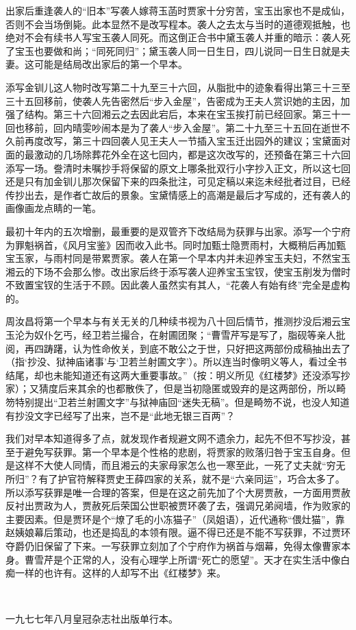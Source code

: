 \par 出家后重逢袭人的“旧本”写袭人嫁蒋玉菡时贾家十分穷苦，宝玉出家也不是成仙，否则不会当场倒毙。此本显然不是改写程本。袭人之去太与当时的道德观抵触，也绝对不会有续书人写宝玉袭人同死。而这倒正合书中黛玉袭人并重的暗示：袭人死了宝玉也要做和尚；“同死同归”；黛玉袭人同一日生日，四儿说同一日生日就是夫妻。这可能是结局改出家后的第一个早本。
\par 添写金钏儿这人物时改写第二十九至三十六回，从脂批中的迹象看得出第三十三至三十五回移前，使袭人先告密然后“步入金屋”，告密成为王夫人赏识她的主因，加强了结构。第三十六回湘云之去因此宕后，本来在宝玉挨打前已经回家。第三十一回也移前，回内晴雯吵闹本是为了袭人“步入金屋”。第二十九至三十五回在逝世不久前再度改写，第三十四回袭人见王夫人一节插入宝玉迁出园外的建议；宝黛面对面的最激动的几场除葬花外全在这七回内，都是这次改写的，还预备在第三十六回添写一场。誊清时未嘱抄手将保留的原文上哪条批双行小字抄入正文，所以这七回还是只有加金钏儿那次保留下来的四条批注，可见定稿以来迄未经批者过目，已经传抄出去，是作者亡故后的景象。宝黛情感上的高潮是最后才写成的，还有袭人的画像画龙点睛的一笔。
\par 最初十年内的五次增删，最重要的是双管齐下改结局为获罪与出家。添写一个宁府为罪魁祸首，《风月宝鉴》因而收入此书。同时加甄士隐贾雨村，大概稍后再加甄宝玉家，与雨村同是带累贾家。袭人在第一个早本内并未迎养宝玉夫妇，不然宝玉湘云的下场不会那么惨。改出家后终于添写袭人迎养宝玉宝钗，使宝玉削发为僧时不致置宝钗的生活于不顾。因此袭人虽然实有其人，“花袭人有始有终”完全是虚构的。
\par 周汝昌将第一个早本与有关无关的几种续书视为八十回后情节，推测抄没后湘云宝玉沦为奴仆乞丐，经卫若兰撮合，在射圃团聚；“曹雪芹写是写了，脂砚等亲人批阅，再四踌躇，认为性命攸关，到底不敢公之于世，只好把这两部份成稿抽出去了（指‘抄没、狱神庙诸事’与‘卫若兰射圃文字’）。所以连当时像明义等人，看过全书结尾，却也未能知道还有这两大重要事故。”（按：明义所见《红楼梦》还没添写抄家）；又猜度后来其余的也都散佚了，但是当初隐匿或毁弃的是这两部份，所以畸笏特别提出“卫若兰射圃文字”与狱神庙回“迷失无稿”。但是畸笏不说，也没人知道有抄没文字已经写了出来，岂不是“此地无银三百两”？
\par 我们对早本知道得多了点，就发现作者规避文网不遗余力，起先不但不写抄没，甚至于避免写获罪。第一个早本是个性格的悲剧，将贾家的败落归咎于宝玉自身。但是这样不大使人同情，而且湘云的夫家母家怎么也一寒至此，一死了丈夫就“穷无所归”？有了护官符解释贾史王薛四家的关系，就不是“六亲同运”，巧合太多了。所以添写获罪是唯一合理的答案，但是在这之前先加了个大房贾赦，一方面用贾赦反衬出贾政为人，贾赦死后荣国公世职被贾环袭了去，强调兄弟阋墙，作为败家的主要因素。但是贾环是个“燎了毛的小冻猫子”（凤姐语），近代通称“偎灶猫”，靠赵姨娘幕后策动，也还是捣乱的本领有限。逼不得已还是不能不写获罪，不过贾环夺爵仍旧保留了下来。一写获罪立刻加了个宁府作为祸首与烟幕，免得太像曹家本身。曹雪芹是个正常的人，没有心理学上所谓“死亡的愿望”。天才在实生活中像白痴一样的也许有。这样的人却写不出《红楼梦》来。
\par  
\par *一九七七年八月皇冠杂志社出版单行本。


















